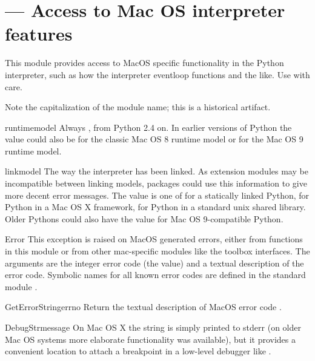 \section{ ---
         Access to Mac OS interpreter features}



This module provides access to MacOS specific functionality in the
Python interpreter, such as how the interpreter eventloop functions
and the like. Use with care.

Note the capitalization of the module name; this is a historical
artifact.

\begin{datadesc}{runtimemodel}
Always , from Python 2.4 on.
In earlier versions of Python the value could
also be  for the classic Mac OS 8 runtime model or
 for the Mac OS 9 runtime model.
\end{datadesc}

\begin{datadesc}{linkmodel}
The way the interpreter has been linked. As extension modules may be
incompatible between linking models, packages could use this information to give
more decent error messages. The value is one of  for a
statically linked Python,  for Python in a Mac OS X framework,
 for Python in a standard unix shared library.
Older Pythons could also have the value
 for Mac OS 9-compatible Python.
\end{datadesc}

\begin{excdesc}{Error}
This exception is raised on MacOS generated errors, either from
functions in this module or from other mac-specific modules like the
toolbox interfaces. The arguments are the integer error code (the
 value) and a textual description of the error code.
Symbolic names for all known error codes are defined in the standard
module .
\end{excdesc}


\begin{funcdesc}{GetErrorString}{errno}
Return the textual description of MacOS error code .
\end{funcdesc}

\begin{funcdesc}{DebugStr}{message }
On Mac OS X the string is simply printed to stderr (on older
Mac OS systems more elaborate functionality was available),
but it provides a convenient location to attach a breakpoint
in a low-level debugger like .
\end{funcdesc}

